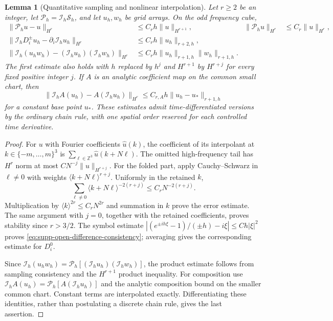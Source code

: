 \documentclass[11pt]{article}
\numberwithin{equation}{section}
\newtheorem{lemma}[lemma]{Lemma}
\theoremstyle{definition}
\theoremstyle{remark}
\begin{document}
\begin{lemma}[Quantitative sampling and nonlinear interpolation]
\label{lem:supp-open-interpolation}
Let $r\ge2$ be an integer, let $\mathcal P_h=\mathcal I_h\mathcal S_h$,
and let $u_h,w_h$ be grid arrays.  On the odd frequency cube,
\begin{align}
 \|\mathcal P_h u-u\|_{H^r}
   &\le C_rh\|u\|_{H^{r+1}},
   &\|\mathcal P_hu\|_{H^r}&\le C_r\|u\|_{H^r},
   \label{eq:supp-open-sampling-estimate}\\
 \|\mathcal I_hD_i^\pm u_h-\partial_i\mathcal I_hu_h\|_{H^r}
   &\le C_rh\|u_h\|_{r+2,h},
   \label{eq:supp-open-difference-consistency}\\
 \|\mathcal I_h(u_hw_h)-(\mathcal I_hu_h)(\mathcal I_hw_h)\|_{H^r}
   &\le C_rh\|u_h\|_{r+1,h}\|w_h\|_{r+1,h}.
   \label{eq:supp-open-product-consistency}
\end{align}
The first estimate also holds with $h$ replaced by $h^j$ and $H^{r+1}$
by $H^{r+j}$ for every fixed positive integer $j$.  If $A$ is an analytic
coefficient map on the common small chart, then
\begin{equation}
 \|\mathcal I_h A(u_h)-A(\mathcal I_hu_h)\|_{H^r}
 \le C_{r,A}h\|u_h-u_*\|_{r+1,h}
 \label{eq:supp-open-composition-consistency}
\end{equation}
for a constant base point $u_*$.  These estimates admit time-differentiated
versions by the ordinary chain rule, with one spatial order reserved for
each controlled time derivative.
\end{lemma}
\begin{proof}
For $u$ with Fourier coefficients $\widehat u(k)$, the coefficient of its
interpolant at $k\in\{-m,\ldots,m\}^3$ is
$\sum_{\ell\in\mathbb Z^3}\widehat u(k+N\ell)$.  The omitted high-frequency
tail has $H^r$ norm at most $C N^{-j}\|u\|_{H^{r+j}}$.  For the folded
part, apply Cauchy--Schwarz in $\ell\ne0$ with weights
$\langle k+N\ell\rangle^{r+j}$.  Uniformly in the retained $k$,
\[
 \sum_{\ell\ne0}\langle k+N\ell\rangle^{-2(r+j)}
 \le C_r N^{-2(r+j)}.
\]
Multiplication by $\langle k\rangle^{2r}\le C_rN^{2r}$ and summation in
$k$ prove the error estimate.  The same argument with $j=0$, together with
the retained coefficients, proves stability since $r>3/2$.
The symbol estimate
$|(e^{\pm ih\xi}-1)/(\pm h)-i\xi|\le Ch|\xi|^2$
proves \eqref{eq:supp-open-difference-consistency}; averaging gives the
corresponding estimate for $D_i^0$.

Since $\mathcal I_h(u_hw_h)=\mathcal P_h[(\mathcal I_hu_h)
(\mathcal I_hw_h)]$, the product estimate follows from sampling consistency
and the $H^{r+1}$ product inequality.  For composition use
$\mathcal I_h A(u_h)=\mathcal P_h[A(\mathcal I_hu_h)]$ and the analytic
composition bound on the smaller common chart.  Constant terms are
interpolated exactly.  Differentiating these identities, rather than
postulating a discrete chain rule, gives the last assertion.
\end{proof}
\end{document}
